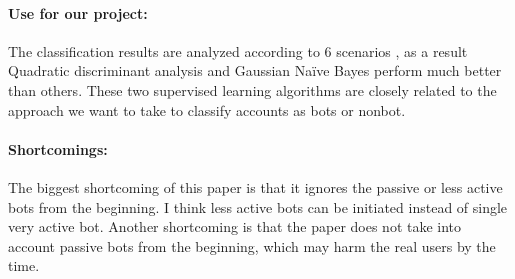 \paragraph{Use for our project:}
The classification results are analyzed according to 6 scenarios , as a result Quadratic discriminant analysis and Gaussian Naïve Bayes perform much better than others. These two supervised learning algorithms are closely related to the approach we want to take to classify accounts as bots or nonbot.  
\paragraph{Shortcomings:}
The biggest shortcoming of this paper is that it ignores the passive or less active bots from the  beginning. I think less active bots can be initiated instead of single very active bot. Another shortcoming is that the paper does not take into account passive bots from the beginning, which may harm the real users by the time. 
